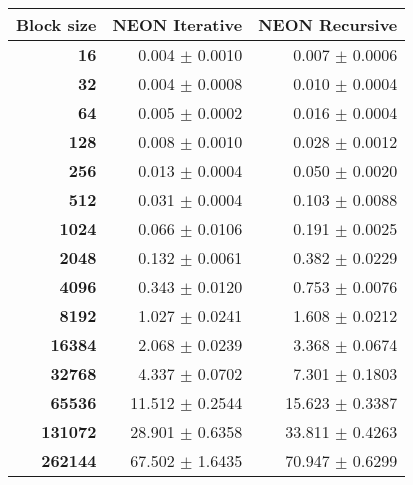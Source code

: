 \begin{tabular}{rrr}\toprule
\textbf{Block size}  & \textbf{NEON Iterative} & \textbf{NEON Recursive} \\\midrule
\textbf{16}  & 0.004 $\pm$ 0.0010 & 0.007 $\pm$ 0.0006 \\
\textbf{32}  & 0.004 $\pm$ 0.0008 & 0.010 $\pm$ 0.0004 \\
\textbf{64}  & 0.005 $\pm$ 0.0002 & 0.016 $\pm$ 0.0004 \\
\textbf{128}  & 0.008 $\pm$ 0.0010 & 0.028 $\pm$ 0.0012 \\
\textbf{256}  & 0.013 $\pm$ 0.0004 & 0.050 $\pm$ 0.0020 \\
\textbf{512}  & 0.031 $\pm$ 0.0004 & 0.103 $\pm$ 0.0088 \\
\textbf{1024}  & 0.066 $\pm$ 0.0106 & 0.191 $\pm$ 0.0025 \\
\textbf{2048}  & 0.132 $\pm$ 0.0061 & 0.382 $\pm$ 0.0229 \\
\textbf{4096}  & 0.343 $\pm$ 0.0120 & 0.753 $\pm$ 0.0076 \\
\textbf{8192}  & 1.027 $\pm$ 0.0241 & 1.608 $\pm$ 0.0212 \\
\textbf{16384}  & 2.068 $\pm$ 0.0239 & 3.368 $\pm$ 0.0674 \\
\textbf{32768}  & 4.337 $\pm$ 0.0702 & 7.301 $\pm$ 0.1803 \\
\textbf{65536}  & 11.512 $\pm$ 0.2544 & 15.623 $\pm$ 0.3387 \\
\textbf{131072}  & 28.901 $\pm$ 0.6358 & 33.811 $\pm$ 0.4263 \\
\textbf{262144} & 67.502 $\pm$ 1.6435 & 70.947 $\pm$ 0.6299 \\
\bottomrule
\end{tabular}
